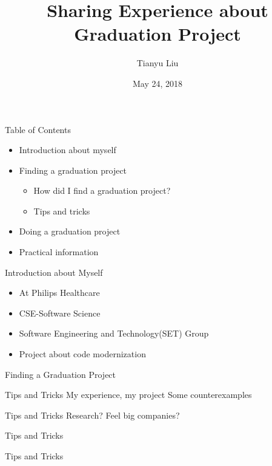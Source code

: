 \documentclass[12pt, aspectratio=43]{beamer}
\title{Sharing Experience about Graduation Project}
\author{Tianyu Liu}
\date{May 24, 2018}
\begin{document}
    
    
\begin{titleframe}
\end{titleframe}

\begin{frame}{Table of Contents}
\begin{itemize}
    \item Introduction about myself
    \item Finding a graduation project
    \begin{itemize}
        \item How did I find a graduation project?
        \item Tips and tricks
    \end{itemize}
    \item Doing a graduation project
    \item Practical information
\end{itemize}
\end{frame}

\begin{frame}{Introduction about Myself}
\begin{itemize}
    \item At Philips Healthcare
    \item CSE-Software Science
    \item Software Engineering and Technology(SET) Group
    \item Project about code modernization
\end{itemize}
\end{frame}

\begin{frame}{Finding a Graduation Project}

\end{frame}

\begin{frame}{Tips and Tricks}
My experience, my project
Some counterexamples 
\end{frame}

\begin{frame}{Tips and Tricks}
Research?
Feel big companies?

\end{frame}

\begin{frame}{Tips and Tricks}
\end{frame}

\begin{frame}{Tips and Tricks}
\end{frame}
\end{document}
